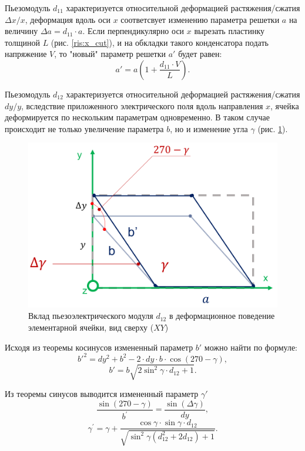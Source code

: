 Пьезомодуль $d_{11}$ характеризуется относительной деформацией растяжения/сжатия $\Delta x/x$, деформация вдоль оси $x$
соответсвует изменению параметра решетки $a$ на величину $\Delta a = d_{11}\cdot a$. %
Если перпендикулярно оси $x$ вырезать пластинку толщиной $L$
(рис. \ref{ris:x_cut}), и на обкладки такого конденсатора подать напряжение
$V$, то "новый" параметр решетки $a{'}$ будет равен:
\begin{equation}
   a{'}  = a \left(1+\frac{d_{11}\cdot V }{L}\right).
   \label{eq:a_deformed}
\end{equation}

Пьезомодуль $d_{12}$ характеризуется относительной деформацией растяжения/сжатия $dy/y$,
вследствие приложенного электрического поля вдоль направления $x$,
ячейка деформируется по нескольким параметрам одновременно. В таком случае
происходит не только увеличение
параметра $b$, но и изменение угла $\gamma$ (рис. \ref{ris:d12}).

\begin{figure}[H]
  \centering
  \includegraphics[width=.6\textwidth]{images/d12.png}
  \caption{Вклад пьезоэлектрического модуля $d_{12}$ в деформационное поведение элементарной ячейки, вид сверху ($XY$)}
  \label{ris:d12}
\end{figure}

Исходя из теоремы косинусов измененный параметр $b'$ можно найти по формуле:
\begin{equation}
   b'^2=dy^2+b^2-2 \cdot dy \cdot b \cdot \cos(270-\gamma), \nonumber
   \label{eq:b_formed_1}
\end{equation}
\begin{equation}
   b' = b \sqrt{ 2\sin^2 \gamma \cdot d_{12}+1}.
   \label{eq:b_formed_2}
\end{equation}

Из теоремы синусов выводится измененный параметр $\gamma'$
\begin{equation}
   \frac{\sin(270-\gamma)}{b^{'}} = \frac{\sin (\Delta \gamma)}{dy}, \nonumber
   \label{eq:b_formed_3}
\end{equation}
\begin{equation}
   \gamma^{'} = \gamma + \frac{\cos\gamma \cdot \sin \gamma \cdot d_{12}}{ \sqrt{ \sin^2 \gamma  (d_{12}^2 + 2d_{12})+1}}.
   \label{eq:b_formed_4}
\end{equation}


